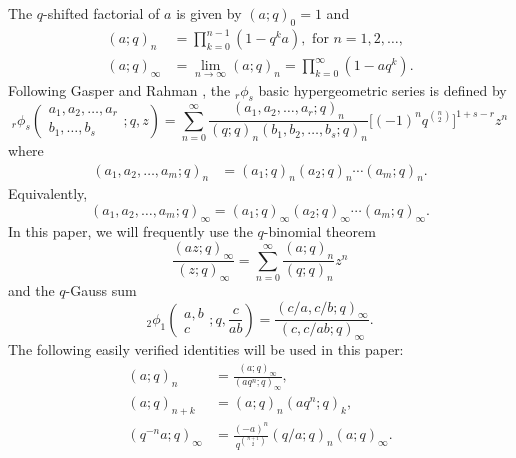 \documentclass[12pt]{article}
\begin{document}
The $q$-shifted factorial of $a$ is given by $(a;q)_{0}=1$ and
\begin{align*}
    (a;q)_{n}&=\prod_{k=0}^{n-1}(1-q^{k}a),\text{ for }n=1,2,\ldots,\\
    (a;q)_{\infty}&=\lim_{n\rightarrow\infty}(a;q)_{n}=\prod_{k=0}^{\infty}(1-aq^{k}).
\end{align*}
Following Gasper and Rahman \cite{GasperRahman}, the ${}_r\phi_{s}$ basic hypergeometric series is defined by
\begin{equation*}
    {}_r\phi_{s}\left(
    \begin{array}{c}
         a_{1},a_{2},\ldots,a_{r} \\
         b_{1},\ldots,b_{s}
    \end{array}
    ;q,z
    \right)=\sum_{n=0}^{\infty}\frac{(a_{1},a_{2},\ldots,a_{r};q)_{n}}{(q;q)_{n}(b_{1},b_{2},\ldots,b_{s};q)_{n}}\Big[(-1)^{n}q^{\binom{n}{2}}\Big]^{1+s-r}z^n
\end{equation*}
where
\begin{align*}
    (a_{1},a_{2},\ldots,a_{m};q)_{n}&=(a_{1};q)_{n}(a_{2};q)_{n}\cdots(a_{m};q)_{n}.
\end{align*}
Equivalently, 
\begin{equation*}
    (a_{1},a_{2},\ldots,a_{m};q)_{\infty}=(a_{1};q)_{\infty}(a_{2};q)_{\infty}\cdots(a_{m};q)_{\infty}.
\end{equation*}
In this paper, we will frequently use the $q$-binomial theorem
\begin{equation}\label{cauchy}
    \frac{(az;q)_{\infty}}{(z;q)_\infty}=\sum_{n=0}^{\infty}\frac{(a;q)_n}{(q;q)_n}z^n
\end{equation}
and the $q$-Gauss sum
\begin{equation}\label{eqn_qgauss}
    {}_{2}\phi_{1}\left(\begin{array}{c}
         a,b\\
         c 
    \end{array};q,\frac{c}{ab}\right)=\frac{(c/a,c/b;q)_{\infty}}{(c,c/ab;q)_{\infty}}.
\end{equation}
The following easily verified identities will be used in this paper:
\begin{align}
    (a;q)_{n}&=\frac{(a;q)_{\infty}}{(aq^n;q)_{\infty}},\label{eqn_iden1}\\
    (a;q)_{n+k}&=(a;q)_{n}(aq^{n};q)_{k},\label{eqn_iden2}\\
    (q^{-n}a;q)_{\infty}&=\frac{(-a)^n}{q^{\binom{n+1}{2}}}(q/a;q)_{n}(a;q)_{\infty}.\label{eqn2}
\end{align}
\end{document}
